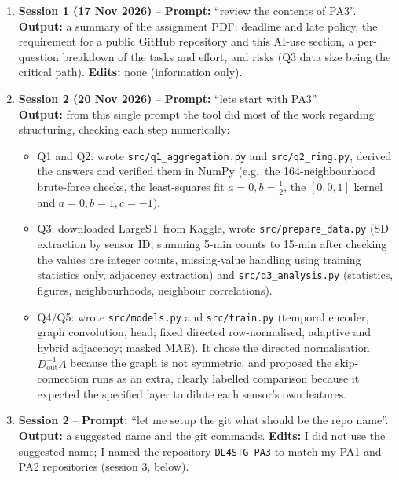 \begin{enumerate}[leftmargin=*]
\item \textbf{Session 1 (17 Nov 2026)} -- \textbf{Prompt:} ``review the contents of PA3''.\\
\textbf{Output:} a summary of the assignment PDF: deadline and late policy, the requirement for a public GitHub repository and this
AI-use section, a per-question breakdown of the tasks and effort, and risks (Q3 data size being the critical path).
\textbf{Edits:} none (information only).

\item \textbf{Session 2 (20 Nov 2026)} -- \textbf{Prompt:} ``lets start with PA3''.\\
\textbf{Output:} from this single prompt the tool did most of the work regarding structuring, checking each step numerically:
\begin{itemize}
\item Q1 and Q2: wrote \texttt{src/q1\_aggregation.py} and \texttt{src/q2\_ring.py}, derived the answers and verified them in NumPy
(e.g.\ the 164-neighbourhood brute-force checks, the least-squares fit $a=0,b=\tfrac12$, the $[0,0,1]$ kernel and $a=0,b=1,c=-1$).
\item Q3: downloaded LargeST from Kaggle, wrote \texttt{src/prepare\_data.py} (SD extraction by sensor ID, summing 5-min counts to
15-min after checking the values are integer counts, missing-value handling using training statistics only, adjacency extraction)
and \texttt{src/q3\_analysis.py} (statistics, figures, neighbourhoods, neighbour correlations).
\item Q4/Q5: wrote \texttt{src/models.py} and \texttt{src/train.py} (temporal encoder, graph convolution, head; fixed directed
row-normalised, adaptive and hybrid adjacency; masked MAE). It chose the directed normalisation $D_{\text{out}}^{-1}\tilde A$
because the graph is not symmetric, and proposed the skip-connection runs as an extra, clearly labelled comparison
because it expected the specified layer to dilute each sensor's own features.
\end{itemize}

\item \textbf{Session 2} -- \textbf{Prompt:} ``let me setup the git what should be the repo name''.\\
\textbf{Output:} a suggested name and the git commands. \textbf{Edits:} I did not use the suggested name; I named the repository
\texttt{DL4STG-PA3} to match my PA1 and PA2 repositories (session 3, below).


\end{enumerate}
